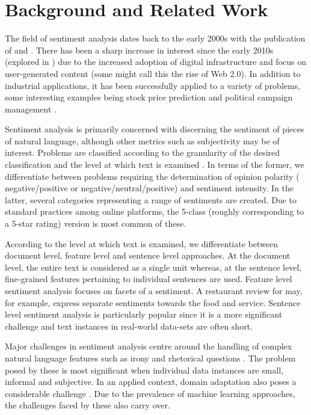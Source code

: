 \documentclass{csfourzero}
\begin{document}
\section{Background and Related Work}
\label{sec:lit}
The field of sentiment analysis dates back to the early 2000s with the publication of
\cite{pangetal} and \cite{turneysemorientation}. There has been a sharp increase in interest since the early 2010s (explored in \cite{bibliometricssentimentanalysis}) due to the increased adoption of digital infrastructure and focus on user-generated content (some might call this the rise of Web 2.0). In addition to industrial applications, it has been successfully applied to a variety of problems, some interesting examples being stock price prediction \cite{smprediction} and political campaign management \cite{campaignprediction}.
\par
Sentiment analysis is primarily concerned with discerning the sentiment of pieces of natural language, although other metrics such as subjectivity may be of interest. Problems are classified according to the granularity of the desired classification \cite[Chapter 2.]{sentimentanalbook} and the level at which text is examined \cite{SAlevels}. In terms of the former, we differentiate between problems requiring the determination of opinion polarity ( negative/positive or negative/neutral/positive) and sentiment intensity.  In the latter, several categories representing a range of sentiments are created. Due to standard practices among online platforms, the 5-class (roughly corresponding to a 5-star rating) version is most common of these.
\par
According to the level at which text is examined, we differentiate between document level, feature level and sentence level approaches. At the document level, the entire text is considered as a single unit whereas, at the sentence level, fine-grained features pertaining to individual sentences are used.  Feature level sentiment analysis focuses on facets of a sentiment. A restaurant review for may, for example, express separate sentiments towards the food and service. Sentence level sentiment analysis is particularly popular since it is a more significant challenge and text instances in real-world data-sets are often short.
\par
Major challenges in sentiment analysis centre around the handling of complex natural language features such as irony and rhetorical questions \cite{challangesinSA}. The problem posed by these is most significant when individual data instances are small, informal and subjective. In an applied context, domain adaptation also poses a considerable challenge \cite{domainadaptation}. Due to the prevalence of machine learning approaches, the challenges faced by these also carry over.
\end{document}
